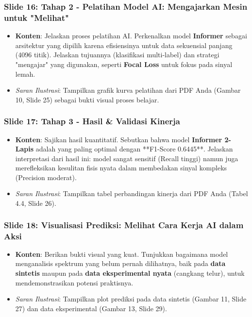 \documentclass[12pt, a4paper]{article}
\begin{document}
\subsubsection*{Slide 16: Tahap 2 - Pelatihan Model AI: Mengajarkan Mesin untuk "Melihat"}
\begin{itemize}
    \item \textbf{Konten}: Jelaskan proses pelatihan AI. Perkenalkan model \textbf{Informer} sebagai arsitektur yang dipilih karena efisiensinya untuk data sekuensial panjang (4096 titik). Jelaskan tujuannya (klasifikasi multi-label) dan strategi "mengajar" yang digunakan, seperti \textbf{Focal Loss} untuk fokus pada sinyal lemah.
    \item \textit{Saran Ilustrasi}: Tampilkan grafik kurva pelatihan dari PDF Anda (Gambar 10, Slide 25) sebagai bukti visual proses belajar.
\end{itemize}

\subsubsection*{Slide 17: Tahap 3 - Hasil \& Validasi Kinerja}
\begin{itemize}
    \item \textbf{Konten}: Sajikan hasil kuantitatif. Sebutkan bahwa model \textbf{Informer 2-Lapis} adalah yang paling optimal dengan **F1-Score 0.6445**. Jelaskan interpretasi dari hasil ini: model sangat sensitif (Recall tinggi) namun juga merefleksikan kesulitan fisis nyata dalam membedakan sinyal kompleks (Precision moderat).
    \item \textit{Saran Ilustrasi}: Tampilkan tabel perbandingan kinerja dari PDF Anda (Tabel 4.4, Slide 26).
\end{itemize}

\subsubsection*{Slide 18: Visualisasi Prediksi: Melihat Cara Kerja AI dalam Aksi}
\begin{itemize}
    \item \textbf{Konten}: Berikan bukti visual yang kuat. Tunjukkan bagaimana model menganalisis spektrum yang belum pernah dilihatnya, baik pada \textbf{data sintetis} maupun pada \textbf{data eksperimental nyata} (cangkang telur), untuk mendemonstrasikan potensi praktisnya.
    \item \textit{Saran Ilustrasi}: Tampilkan plot prediksi pada data sintetis (Gambar 11, Slide 27) dan data eksperimental (Gambar 13, Slide 29).
\end{itemize}
\end{document}
